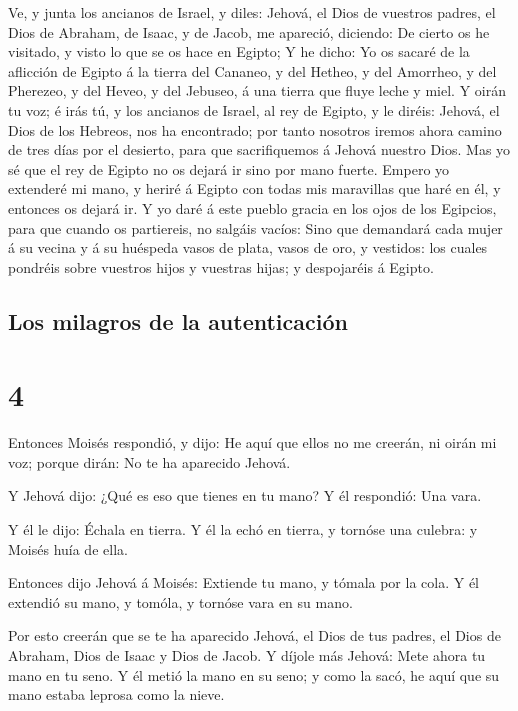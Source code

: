  Ve, y junta los ancianos de Israel, y diles: Jehová, el
Dios de vuestros padres, el Dios de Abraham, de Isaac, y de Jacob, me
apareció, diciendo: De cierto os he visitado, y visto lo que se os hace
en Egipto;  Y he dicho: Yo os sacaré de la aflicción de
Egipto á la tierra del Cananeo, y del Hetheo, y del Amorrheo, y del
Pherezeo, y del Heveo, y del Jebuseo, á una tierra que fluye leche y
miel.  Y oirán tu voz; é irás tú, y los ancianos de
Israel, al rey de Egipto, y le diréis: Jehová, el Dios de los Hebreos,
nos ha encontrado; por tanto nosotros iremos ahora camino de tres días
por el desierto, para que sacrifiquemos á Jehová nuestro Dios.
 Mas yo sé que el rey de Egipto no os dejará ir sino por
mano fuerte.  Empero yo extenderé mi mano, y heriré á
Egipto con todas mis maravillas que haré en él, y entonces os dejará ir.
 Y yo daré á este pueblo gracia en los ojos de los
Egipcios, para que cuando os partiereis, no salgáis vacíos:
 Sino que demandará cada mujer á su vecina y á su
huéspeda vasos de plata, vasos de oro, y vestidos: los cuales pondréis
sobre vuestros hijos y vuestras hijas; y despojaréis á Egipto.

\hypertarget{los-milagros-de-la-autenticaciuxf3n}{%
\subsection{Los milagros de la
autenticación}\label{los-milagros-de-la-autenticaciuxf3n}}

\hypertarget{section-02-4}{%
\section{4}\label{section-02-4}}

 Entonces Moisés respondió, y dijo: He aquí que ellos no
me creerán, ni oirán mi voz; porque dirán: No te ha aparecido Jehová.

 Y Jehová dijo: ¿Qué es eso que tienes en tu mano? Y él
respondió: Una vara.

 Y él le dijo: Échala en tierra. Y él la echó en tierra, y
tornóse una culebra: y Moisés huía de ella.

 Entonces dijo Jehová á Moisés: Extiende tu mano, y tómala
por la cola. Y él extendió su mano, y tomóla, y tornóse vara en su mano.

 Por esto creerán que se te ha aparecido Jehová, el Dios
de tus padres, el Dios de Abraham, Dios de Isaac y Dios de Jacob.
 Y díjole más Jehová: Mete ahora tu mano en tu seno. Y él
metió la mano en su seno; y como la sacó, he aquí que su mano estaba
leprosa como la nieve.

